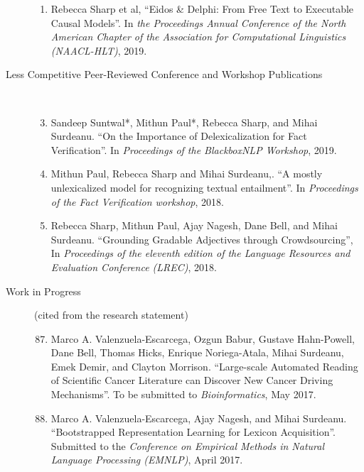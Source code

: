 \documentclass[10pt]{article}
\newcommand{\ve}[1]{{\em #1}} %
\newcommand{\ti}[1]{``#1''} %
\begin{document}
\begin{description}
\begin{enumerate}
\item  Rebecca Sharp et al,   \ti{Eidos \& Delphi: From Free Text to Executable Causal Models}. In \ve{ the Proceedings Annual Conference of the North American Chapter of the Association for Computational Linguistics (NAACL-HLT)}, 2019.

\end{enumerate}

\item [Less Competitive Peer-Reviewed Conference and Workshop Publications]\

\begin{enumerate}
\setcounter{enumi}{2}


\item Sandeep Suntwal*, Mithun Paul*, Rebecca Sharp, and Mihai Surdeanu.   \ti{On the Importance of Delexicalization for Fact Verification}. In \ve{Proceedings of the BlackboxNLP Workshop}, 2019.

\item Mithun Paul, Rebecca Sharp and Mihai Surdeanu,.   \ti{A mostly unlexicalized model for recognizing textual entailment}. In \ve{Proceedings of the Fact Verification workshop}, 2018.

\item Rebecca Sharp, Mithun Paul, Ajay Nagesh, Dane  Bell, and Mihai Surdeanu.   \ti{Grounding Gradable Adjectives through Crowdsourcing}, In \ve{Proceedings of the eleventh edition of the Language Resources and Evaluation Conference (LREC)}, 2018.



\end{enumerate}


\item [Work in Progress] (cited from the research statement)\
\begin{enumerate}
\setcounter{enumi}{86}

\item 
Marco A. Valenzuela-Escarcega, Ozgun Babur, Gustave Hahn-Powell, Dane Bell, Thomas Hicks, Enrique Noriega-Atala, Mihai Surdeanu, Emek Demir, and Clayton Morrison.  \ti{Large-scale Automated Reading of Scientific Cancer Literature can Discover New  Cancer Driving Mechanisms}. To be submitted to \ve{Bioinformatics}, May 2017.

\item
Marco A. Valenzuela-Escarcega, Ajay Nagesh, and Mihai Surdeanu.  \ti{Bootstrapped Representation Learning for Lexicon Acquisition}.  Submitted to the \ve{Conference on Empirical Methods in Natural Language Processing (EMNLP)}, April 2017.


\end{enumerate}
\end{description}
\end{document}

